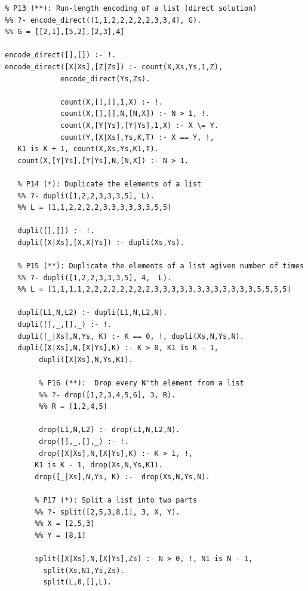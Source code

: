 \documentclass[a4paper,12pt]{book}
\begin{document}
\begin{verbatim}
% P13 (**): Run-length encoding of a list (direct solution) 
%% ?- encode_direct([1,1,2,2,2,2,2,3,3,4], G).
%% G = [[2,1],[5,2],[2,3],4]

encode_direct([],[]) :- !.
encode_direct([X|Xs],[Z|Zs]) :- count(X,Xs,Ys,1,Z),
		     encode_direct(Ys,Zs).

		     count(X,[],[],1,X) :- !.
		     count(X,[],[],N,[N,X]) :- N > 1, !.
		     count(X,[Y|Ys],[Y|Ys],1,X) :- X \= Y.
		     count(Y,[X|Xs],Ys,K,T) :- X == Y, !,
   K1 is K + 1, count(X,Xs,Ys,K1,T).
   count(X,[Y|Ys],[Y|Ys],N,[N,X]) :- N > 1.

   % P14 (*): Duplicate the elements of a list
   %% ?- dupli([1,2,2,3,3,3,5], L).
   %% L = [1,1,2,2,2,2,3,3,3,3,3,3,5,5]

   dupli([],[]) :- !.
   dupli([X|Xs],[X,X|Ys]) :- dupli(Xs,Ys).

   % P15 (**): Duplicate the elements of a list agiven number of times
   %% ?- dupli([1,2,2,3,3,3,5], 4,  L).
   %% L = [1,1,1,1,2,2,2,2,2,2,2,2,3,3,3,3,3,3,3,3,3,3,3,3,5,5,5,5]

   dupli(L1,N,L2) :- dupli(L1,N,L2,N).
   dupli([],_,[],_) :- !.
   dupli([_|Xs],N,Ys, K) :- K == 0, !, dupli(Xs,N,Ys,N).
   dupli([X|Xs],N,[X|Ys],K) :- K > 0, K1 is K - 1,
		dupli([X|Xs],N,Ys,K1).

		% P16 (**):  Drop every N'th element from a list
		%% ?- drop([1,2,3,4,5,6], 3, R).
		%% R = [1,2,4,5]

		drop(L1,N,L2) :- drop(L1,N,L2,N).
		drop([],_,[],_) :- !.
		drop([X|Xs],N,[X|Ys],K) :- K > 1, !,
       K1 is K - 1, drop(Xs,N,Ys,K1).
       drop([_|Xs],N,Ys, K) :-  drop(Xs,N,Ys,N).

       % P17 (*): Split a list into two parts
       %% ?- split([2,5,3,8,1], 3, X, Y).
       %% X = [2,5,3]
       %% Y = [8,1]

       split([X|Xs],N,[X|Ys],Zs) :- N > 0, !, N1 is N - 1,
		 split(Xs,N1,Ys,Zs).
		 split(L,0,[],L).
\end{verbatim}
\end{document}
